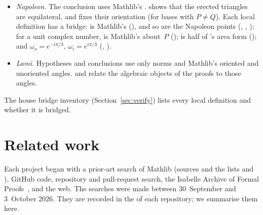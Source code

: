 \documentclass[11pt]{article}
\theoremstyle{definition}
\theoremstyle{remark}
\begin{document}
\begin{itemize}
\item \emph{Napoleon.} The conclusion uses Mathlib's .
 shows that the erected triangles are equilateral, and
 fixes their orientation (for bases with $P\ne Q$). Each local
definition has a bridge:  is Mathlib's 
(), and so are the Napoleon points
(, , );
for a unit complex number,  is Mathlib's  about~$P$
();  is half of
's area form (); and
$\omega_o=e^{-i\pi/3}$, $\omega_i=e^{i\pi/3}$ (, ).
\item \emph{Lami.} Hypotheses and conclusions use only norms and Mathlib's oriented and unoriented
angles.  and
 relate the algebraic objects of the proofs to those
angles.
\end{itemize}
The house bridge inventory (Section~\ref{sec:verify}) lists every local definition and whether it
is bridged.

\section{Related work}\label{sec:related}

Each project began with a prior-art search of Mathlib (sources and the lists
 and ), GitHub code, repository and pull-request search,
the Isabelle Archive of Formal Proofs~\cite{AFP}, and the web. The searches were made between
30~September and 3~October 2026. They are recorded in the  of each
repository; we summarise them here.
\end{document}
